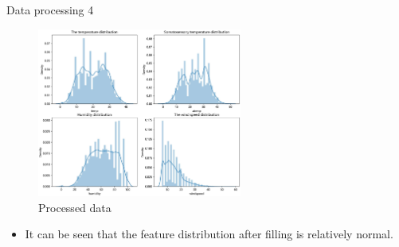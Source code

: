 \documentclass[
  size=14pt,
  paper=smartboard,  %
  mode=present, 		%
  display=slides, 	%
  style=tuliplab,  	%
  pauseslide,
  fleqn,leqno]{powerdot}
\begin{document}
          
        \begin{slide}{Data processing 4}
          
          \begin{figure}[htb]
            \centering
            \includegraphics[width=0.6\textwidth,trim=60 60 60 60,clip]{figures//analysis2.eps}
            \vspace{-1.3em}
            \caption{Processed data}
          \end{figure}
          \vspace{-1.4em}
          \begin{itemize}
            \item
            It can be seen that the feature distribution after filling is relatively normal.
            \end{itemize}
         
        \end{slide}
\end{document}
